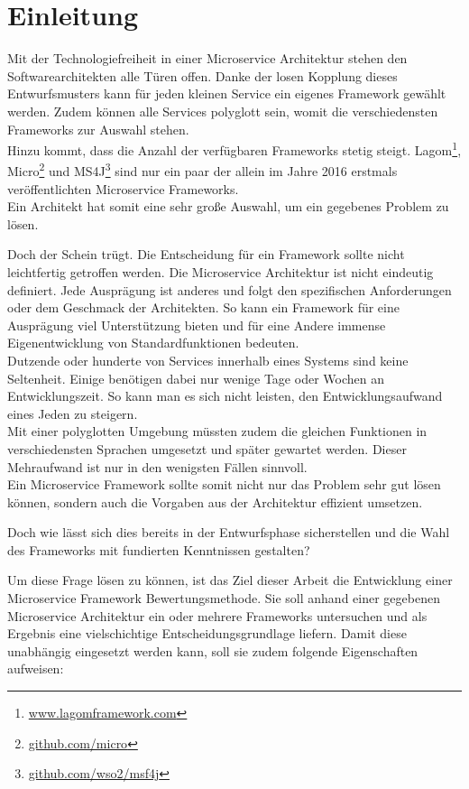 \section{Einleitung}

Mit der Technologiefreiheit in einer Microservice Architektur stehen den Softwarearchitekten alle Türen offen. Danke der losen Kopplung dieses Entwurfsmusters kann für jeden kleinen Service ein eigenes Framework gewählt werden. Zudem können alle Services polyglott sein, womit die verschiedensten Frameworks zur Auswahl stehen.\\
Hinzu kommt, dass die Anzahl der verfügbaren Frameworks stetig steigt. Lagom\footnote{\url{www.lagomframework.com}},  Micro\footnote{\url{github.com/micro}} und MS4J\footnote{\url{github.com/wso2/msf4j}} sind nur ein paar der allein im Jahre 2016 erstmals veröffentlichten Microservice Frameworks.\\
Ein Architekt hat somit eine sehr große Auswahl, um ein gegebenes Problem zu lösen.

Doch der Schein trügt. Die Entscheidung für ein Framework sollte nicht leichtfertig getroffen werden. Die Microservice Architektur ist nicht eindeutig definiert\cite[11]{Wolff2015}. Jede Ausprägung ist anderes und folgt den spezifischen Anforderungen oder dem Geschmack der Architekten. So kann ein Framework für eine Ausprägung viel Unterstützung bieten und für eine Andere immense Eigenentwicklung von Standardfunktionen bedeuten.\\
Dutzende oder hunderte von Services innerhalb eines Systems sind keine Seltenheit. Einige benötigen dabei nur wenige Tage oder Wochen an Entwicklungszeit. So kann man es sich nicht leisten, den Entwicklungsaufwand eines Jeden zu steigern\cite{Richardson2016}.\\ 
Mit einer polyglotten Umgebung müssten zudem die gleichen Funktionen in verschiedensten Sprachen umgesetzt und später gewartet werden. Dieser Mehraufwand ist nur in den wenigsten Fällen sinnvoll.\\
Ein Microservice Framework sollte somit nicht nur das Problem sehr gut lösen können, sondern auch die Vorgaben aus der Architektur effizient umsetzen.  

Doch wie lässt sich dies bereits in der Entwurfsphase sicherstellen und die Wahl des Frameworks mit fundierten Kenntnissen gestalten?

Um diese Frage lösen zu können, ist das Ziel dieser Arbeit die Entwicklung einer Microservice Framework Bewertungsmethode. Sie soll anhand einer gegebenen Microservice Architektur ein oder mehrere Frameworks untersuchen und als Ergebnis eine vielschichtige Entscheidungsgrundlage liefern.
Damit diese unabhängig eingesetzt werden kann, soll sie zudem folgende Eigenschaften aufweisen:

